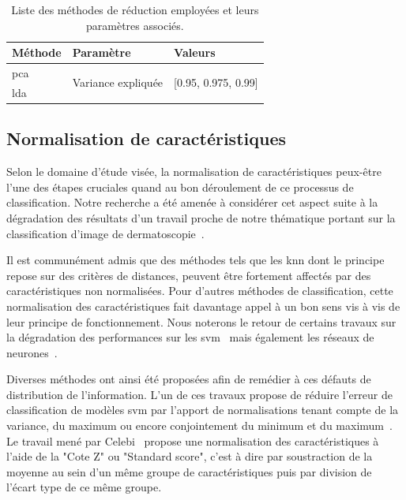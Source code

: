 \begin{table}[H]
    \centering
    \begin{tabular*}{0.6\linewidth}{lll}
    \toprule
    \textbf{Méthode}       & \textbf{Paramètre}                 & \textbf{Valeurs}                      \\ \midrule
    \gls{pca}              & \multirow{2}{*}{Variance expliquée}& \multirow{2}{*}{[0.95, 0.975, 0.99]}  \\ \cline{1-1}
    \gls{lda}              &                                    &                                       \\ 
    \bottomrule
    \end{tabular*}
    \caption{Liste des méthodes de réduction employées et leurs paramètres associés.}
    \label{tab:summary_reduction_methods}
\end{table}\par

\subsection{Normalisation de caractéristiques}
\label{subsec:features_normalisation}
Selon le domaine d'étude visée, la normalisation de caractéristiques peux-être l'une des étapes cruciales quand au bon déroulement de ce processus de classification. Notre recherche a été amenée à considérer cet aspect suite à la dégradation des résultats d'un travail proche de notre thématique portant sur la classification d'image de dermatoscopie~\cite{Celebi2007}.\par

Il est communément admis que des méthodes tels que les \gls{knn} dont le principe repose sur des critères de distances, peuvent être fortement affectés par des caractéristiques non normalisées. Pour d'autres méthodes de classification, cette normalisation des caractéristiques fait davantage appel à un bon sens vis à vis de leur principe de fonctionnement. Nous noterons le retour de certains travaux sur la dégradation des performances sur les \gls{svm}~\cite{Juszczak2002} mais également les réseaux de neurones~\cite{Celebi2007}.\par

Diverses méthodes ont ainsi été proposées afin de remédier à ces défauts de distribution de l'information. L'un de ces travaux propose de réduire l'erreur de classification de modèles \gls{svm} par l'apport de normalisations tenant compte de la variance, du maximum ou encore conjointement du minimum et du maximum~\cite{Juszczak2002}. Le travail mené par Celebi~\cite{Celebi2007} propose une normalisation des caractéristiques à l'aide de la "Cote Z" ou "Standard score", c'est à dire par soustraction de la moyenne au sein d'un même groupe de caractéristiques puis par division de l'écart type de ce même groupe.\par

